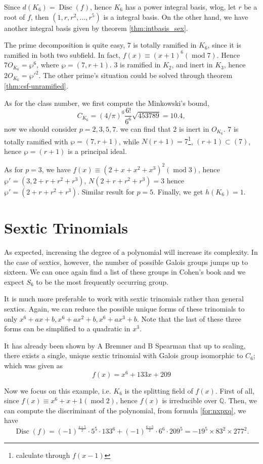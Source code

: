 Since $d(K_6)=\operatorname{Disc}(f)$, hence $K_6$ has a power integral basis, wlog, let $r$ be a root of $f$, then $(1,r,r^2,\dots,r^5)$ is a integral basis. On the other hand, we have another integral basis given by theorem \ref{thm:intbasis_sex}.

The prime decomposition is quite easy, $7$ is totally ramified in $K_6$, since it is ramified in both two subfield. In fact, $f(x)\equiv (x+1)^6 (\operatorname{mod} 7)$. Hence $7O_{K_6}=\wp^6$, where $\wp=(7,r+1)$. $3$ is ramified in $K_2$, and inert in $K_3$, hence $2O_{K_6}=\wp'^2$. The other prime's situation could be solved through theorem \ref{thm:csf-unramified}.

As for the class number, we first compute the Minkowski's bound, $$C_{K_{6}}=(4/\pi)^{0}\frac{6!}{6^6}\sqrt{453789}=10.4,$$ now we should consider $p=2,3,5,7$. we can find that $2$ is inert in $O_{K_6}$. $7$ is totally ramified with $\wp=(7,r+1)$, while $N(r+1)=7$\footnote{calculate through $f(x-1)$}, $(r+1)\subset(7)$, hence $\wp=(r+1)$ is a principal ideal.

As for $p=3$, we have $f(x)\equiv(2+x+x^2+x^3)^2 (\operatorname{mod} 3)$, hence $\wp'=(3,2+r+r^2+r^3)$, $N(2+r+r^2+r^3)=3$ hence $\wp'=(2+r+r^2+r^3)$. Similar result for $p=5$. Finally, we get $h(K_6)=1$.

\section{Sextic Trinomials}
As expected, increasing the degree of a polynomial will increase its complexity. In the case of sextics, however, the number of possible Galois groups jumps up to sixteen. We can once again find a list of these groups in Cohen's book and we expect $S_6$ to be the most frequently occurring group. 

It is much more preferable to work with sextic trinomials rather than general sextics. Again, we can reduce the possible unique forms of these trinomials to only $x^6+ax+b,x^6+ax^2+b,x^6+ax^3+b$. Note that the last of these three forms can be simplified to a quadratic in $x^3$.

It has already been shown by A Bremner and B Spearman \citep{bremner2010cyclic} that up to scaling, there exists a single, unique sextic trinomial with Galois group isomorphic to $C_6$; which was given as
$$f(x)=x^6+133x+209$$

Now we focus on this example, i.e. $K_6$ is the splitting field of $f(x)$. First of all, since $f(x)\equiv x^6+x+1(\operatorname{mod} 2)$, hence $f(x)$ is irreducible over $\mathbb{Q}$.  Then, we can compute the discriminant of the polynomial, from formula \ref{for:nxpxq}, we have $$\operatorname{Disc}(f)=(-1)^{\frac{4\times5}{2}}\cdot 5^5\cdot 133^6+(-1)^{\frac{6\times5}{2}}\cdot 6^6\cdot 209^5=-19^5\times83^2\times277^2.$$

